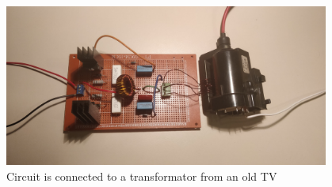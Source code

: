 \begin{figure}[htbp]
	\centering
	\includegraphics[width=0.95\textwidth]{images/circuit.jpg}
	\caption*{Circuit is connected to a transformator from an old TV}
	\label{circuit}
\end{figure}